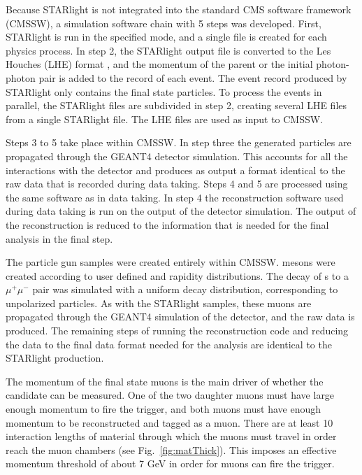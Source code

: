     Because STARlight is not integrated into the standard CMS software 
      framework (CMSSW), a simulation software chain with 5 steps 
      was developed.
    First, STARlight is run in the specified mode, and a single file is 
      created for each physics process. 
    In step 2, the STARlight output file is converted to the Les Houches \DIFaddbegin {}\DIFaddend (LHE) format \cite{lheFormat}, and the momentum of the parent \JPsi{} or 
      the initial photon-photon pair is added to the record of each event.
    The event record produced by STARlight only contains the final state 
      particles.
    To process the events in parallel, the STARlight files are subdivided 
      in step 2, creating several LHE files from a single STARlight file.
    The LHE files are used as input to CMSSW.

    Steps 3 to 5 take place within CMSSW. 
    In step three the generated particles are propagated through the GEANT4 
      \cite{geant} detector simulation.
    This accounts for all the interactions with the detector and produces as 
      output a format identical to the raw data that is recorded during data
      taking.
    Steps 4 and 5 are processed using the same software as in data taking.
    In step 4 the reconstruction software used during data taking is run on 
      the output of the detector simulation.
    The output of the reconstruction is reduced to the information that is 
      needed for the final analysis in the final step.

    The particle gun samples were created entirely within CMSSW.
    \JPsi{} mesons were created according to user defined \pt{} and rapidity
      distributions. 
    The decay of \JPsi{}s to a $\mu^{+}$$\mu^{-}$ pair was simulated with
      a uniform decay distribution, corresponding to unpolarized \JPsi{} 
      particles.
    As with the STARlight samples, these muons are propagated through the GEANT4
      simulation \cite{geant} of the detector, and the raw data is produced.
    The remaining steps of running the reconstruction code and reducing the 
      data to the final data format needed for the analysis are identical to 
      the STARlight production.

    The momentum of the final state muons is the main driver of whether the 
      candidate can be measured.
    One of the two daughter muons must have large enough momentum to fire the 
      trigger, and both muons must have enough momentum to be 
      reconstructed and tagged as a muon. 
    There are at least 10 interaction lengths of material through which the 
      muons must travel in order reach the muon chambers 
      (see Fig.~\ref{fig:matThick}).
    This imposes an effective momentum threshold of about 7 GeV in order for 
      muons can fire the trigger. 

